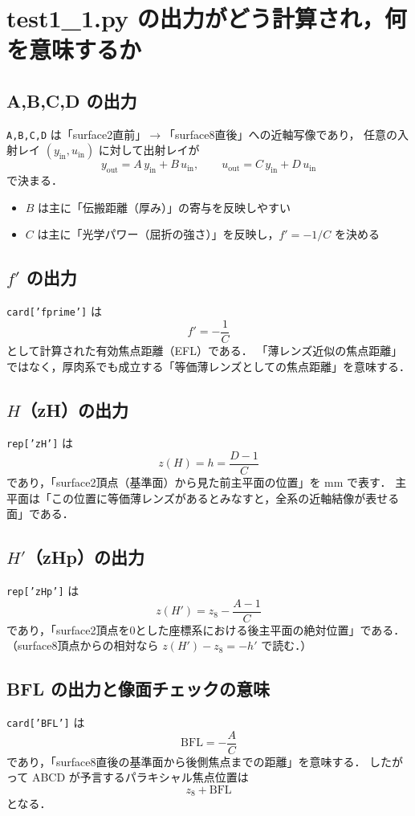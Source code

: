 \documentclass[a4paper,11pt]{jsarticle} %
\begin{document}
\section{test1\_1.py の出力がどう計算され，何を意味するか}

\subsection{A,B,C,D の出力}
\texttt{A,B,C,D} は「surface2直前」$\rightarrow$「surface8直後」への近軸写像であり，
任意の入射レイ $(y_{\text{in}},u_{\text{in}})$ に対して出射レイが
\[
y_{\text{out}} = A\,y_{\text{in}} + B\,u_{\text{in}},\qquad
u_{\text{out}} = C\,y_{\text{in}} + D\,u_{\text{in}}
\]
で決まる．
\begin{itemize}
  \item $B$ は主に「伝搬距離（厚み）」の寄与を反映しやすい
  \item $C$ は主に「光学パワー（屈折の強さ）」を反映し，$f'=-1/C$ を決める
\end{itemize}

\subsection{$f'$ の出力}
\texttt{card['fprime']} は
\[
f'=-\frac{1}{C}
\]
として計算された有効焦点距離（EFL）である．
「薄レンズ近似の焦点距離」ではなく，厚肉系でも成立する「等価薄レンズとしての焦点距離」を意味する．

\subsection{$H$（zH）の出力}
\texttt{rep['zH']} は
\[
z(H)=h=\frac{D-1}{C}
\]
であり，「surface2頂点（基準面）から見た前主平面の位置」を mm で表す．
主平面は「この位置に等価薄レンズがあるとみなすと，全系の近軸結像が表せる面」である．

\subsection{$H'$（zHp）の出力}
\texttt{rep['zHp']} は
\[
z(H')=z_8-\frac{A-1}{C}
\]
であり，「surface2頂点を0とした座標系における後主平面の絶対位置」である．
（surface8頂点からの相対なら $z(H')-z_8=-h'$ で読む．）

\subsection{BFL の出力と像面チェックの意味}
\texttt{card['BFL']} は
\[
\mathrm{BFL}=-\frac{A}{C}
\]
であり，「surface8直後の基準面から後側焦点までの距離」を意味する．
したがって ABCD が予言するパラキシャル焦点位置は
\[
z_8+\mathrm{BFL}
\]
となる．
\end{document}
